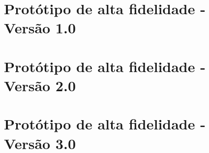 \begin{apendicesenv}
\chapter{Protótipo de alta fidelidade - Versão 1.0}

\chapter{Protótipo de alta fidelidade - Versão 2.0}

\chapter{Protótipo de alta fidelidade - Versão 3.0} 

\end{apendicesenv}
